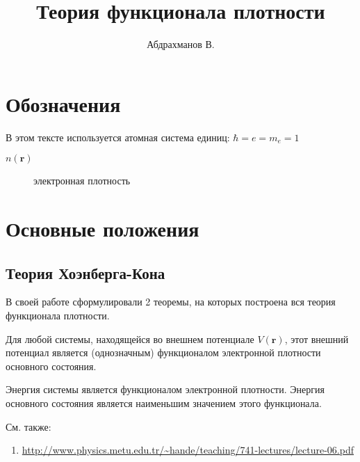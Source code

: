 \documentclass[11pt,russian]{ncc}
\title{Теория функционала плотности}
\author{Абдрахманов В.}
\renewcommand{\vec}{\boldsymbol}
\begin{document}
    \maketitle
    \tableofcontents
    \section*{Обозначения}
    В этом тексте используется атомная система единиц: $ \hbar = e = m_e = 1$
    \begin{description}
        \item[$n(\vec{r})$] электронная плотность
    \end{description}
    \section{Основные положения}
    \subsection{Теория Хоэнберга-Кона}
    В своей работе \cite{Hohenberg-Kohn} сформулировали 2 теоремы, на которых построена вся теория функционала плотности.

    \begin{theorem}
        Для любой системы, находящейся во внешнем потенциале \( V(\vec{r}) \), этот внешний потенциал является (однозначным) функционалом электронной плотности основного состояния.
    \end{theorem}

    \begin{theorem}
        Энергия системы является функционалом электронной плотности. Энергия основного состояния является наименьшим значением этого функционала.
    \end{theorem}

    См. также:
    \begin{enumerate}
        \item \url{http://www.physics.metu.edu.tr/~hande/teaching/741-lectures/lecture-06.pdf}
    \end{enumerate}
\end{document}
